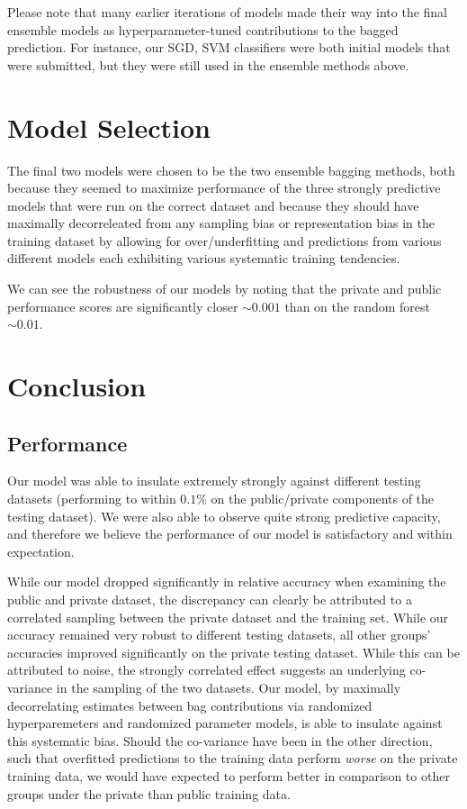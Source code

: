 \documentclass[10pt, preprint2]{aastex}
\begin{document}
Please note that many earlier iterations of models made their way into the final ensemble models as hyperparameter-tuned contributions to the bagged prediction. For instance, our SGD, SVM classifiers were both initial models that were submitted, but they were still used in the ensemble methods above.

\section{Model Selection}

The final two models were chosen to be the two ensemble bagging methods, both because they seemed to maximize performance of the three strongly predictive models that were run on the correct dataset and because they should have maximally decorreleated from any sampling bias or representation bias in the training dataset by allowing for over/underfitting and predictions from various different models each exhibiting various systematic training tendencies. 

We can see the robustness of our models by noting that the private and public performance scores are significantly closer $\sim 0.001$ than on the random forest $\sim 0.01$.

\section{Conclusion}

\subsection{Performance}

Our model was able to insulate extremely strongly against different testing datasets (performing to within $0.1\%$ on the public/private components of the testing dataset). We were also able to observe quite strong predictive capacity, and therefore we believe the performance of our model is satisfactory and within expectation.

While our model dropped significantly in relative accuracy when examining the public and private dataset, the discrepancy can clearly be attributed to a correlated sampling between the private dataset and the training set. While our accuracy remained very robust to different testing datasets, all other groups' accuracies improved significantly on the private testing dataset. While this can be attributed to noise, the strongly correlated effect suggests an underlying co-variance in the sampling of the two datasets. Our model, by maximally decorrelating estimates between bag contributions via randomized hyperparemeters and randomized parameter models, is able to insulate against this systematic bias. Should the co-variance have been in the other direction, such that overfitted predictions to the training data perform \emph{worse} on the private training data, we would have expected to perform better in comparison to other groups under the private than public training data.
\end{document}
